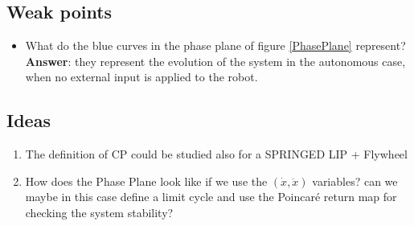 \subsection*{Weak points}
\begin{itemize}
\item What do the blue curves in the phase plane of figure \ref{PhasePlane} represent? \textbf{Answer}: they represent the evolution of the system in the autonomous case, when no external input is applied to the robot.
\end{itemize}
\subsection*{Ideas}
\begin{enumerate}
\item The definition of CP could be studied also for a SPRINGED LIP + Flywheel
\item How does the Phase Plane look like if we use the $(\dot{x},\ddot{x})$ variables? can we maybe in this case define a limit cycle and use the Poincar\'e return map for checking the system stability?
\end{enumerate}
